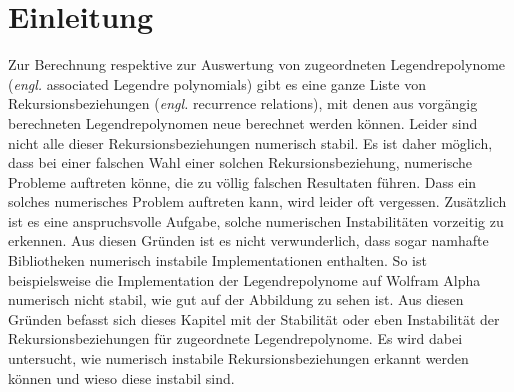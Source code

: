 %
%
%
\section{Einleitung\label{legendre:section:einleitung}}
Zur Berechnung respektive zur Auswertung von zugeordneten Legendrepolynome (\textit{engl.} associated Legendre polynomials) gibt es eine ganze Liste von Rekursionsbeziehungen (\textit{engl.} recurrence relations), mit denen aus vorgängig berechneten Legendrepolynomen neue berechnet werden können.
Leider sind nicht alle dieser Rekursionsbeziehungen numerisch stabil.
Es ist daher möglich, dass bei einer falschen Wahl einer solchen Rekursionsbeziehung, numerische Probleme auftreten könne, die zu völlig falschen Resultaten führen.
Dass ein solches numerisches Problem auftreten kann, wird leider oft vergessen.
Zusätzlich ist es eine anspruchsvolle Aufgabe, solche numerischen Instabilitäten vorzeitig zu erkennen.
Aus diesen Gründen ist es nicht verwunderlich, dass sogar namhafte Bibliotheken numerisch instabile Implementationen enthalten.
So ist beispielsweise die Implementation der Legendrepolynome auf Wolfram Alpha \cite{legendre:wolfram-alpha} numerisch nicht stabil, wie gut auf der Abbildung  zu sehen ist.
Aus diesen Gründen befasst sich dieses Kapitel mit der Stabilität oder eben Instabilität der Rekursionsbeziehungen für zugeordnete Legendrepolynome.
Es wird dabei untersucht, wie numerisch instabile Rekursionsbeziehungen erkannt werden können und wieso diese instabil sind.








